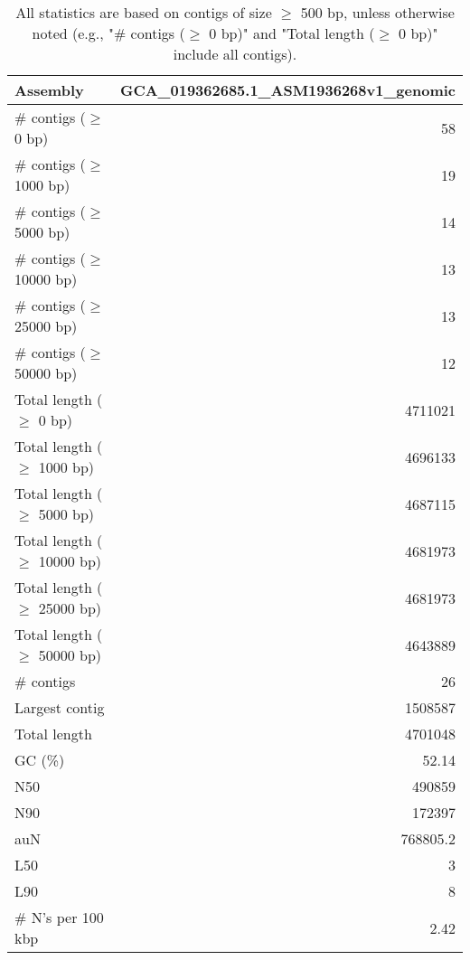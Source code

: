 \documentclass[12pt,a4paper]{article}
\begin{document}
\begin{table}[ht]
\begin{center}
\caption{All statistics are based on contigs of size $\geq$ 500 bp, unless otherwise noted (e.g., "\# contigs ($\geq$ 0 bp)" and "Total length ($\geq$ 0 bp)" include all contigs).}
\begin{tabular}{|l*{1}{|r}|}
\hline
Assembly & GCA\_019362685.1\_ASM1936268v1\_genomic \\ \hline
\# contigs ($\geq$ 0 bp) & 58 \\ \hline
\# contigs ($\geq$ 1000 bp) & 19 \\ \hline
\# contigs ($\geq$ 5000 bp) & 14 \\ \hline
\# contigs ($\geq$ 10000 bp) & 13 \\ \hline
\# contigs ($\geq$ 25000 bp) & 13 \\ \hline
\# contigs ($\geq$ 50000 bp) & 12 \\ \hline
Total length ($\geq$ 0 bp) & 4711021 \\ \hline
Total length ($\geq$ 1000 bp) & 4696133 \\ \hline
Total length ($\geq$ 5000 bp) & 4687115 \\ \hline
Total length ($\geq$ 10000 bp) & 4681973 \\ \hline
Total length ($\geq$ 25000 bp) & 4681973 \\ \hline
Total length ($\geq$ 50000 bp) & 4643889 \\ \hline
\# contigs & 26 \\ \hline
Largest contig & 1508587 \\ \hline
Total length & 4701048 \\ \hline
GC (\%) & 52.14 \\ \hline
N50 & 490859 \\ \hline
N90 & 172397 \\ \hline
auN & 768805.2 \\ \hline
L50 & 3 \\ \hline
L90 & 8 \\ \hline
\# N's per 100 kbp & 2.42 \\ \hline
\end{tabular}
\end{center}
\end{table}
\end{document}
